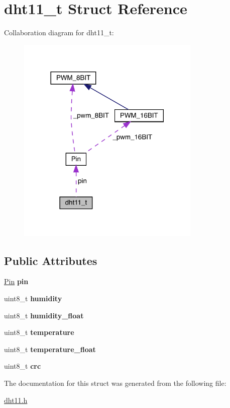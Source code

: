 \hypertarget{structdht11__t}{}\section{dht11\+\_\+t Struct Reference}
\label{structdht11__t}


Collaboration diagram for dht11\+\_\+t\+:\nopagebreak
\begin{figure}[H]
\begin{center}
\leavevmode
\includegraphics[width=248pt]{structdht11__t__coll__graph}
\end{center}
\end{figure}
\subsection*{Public Attributes}
\begin{DoxyCompactItemize}
\item 
\mbox{\label{structdht11__t_af7ba765d61375a8088a63e33b4e91a35}} 
\hyperlink{classPin}{Pin} {\bfseries pin}
\item 
\mbox{\label{structdht11__t_a981a3577bb83ac4f3f8f566e4eb9976c}} 
uint8\+\_\+t {\bfseries humidity}
\item 
\mbox{\label{structdht11__t_a3426ca69a0d25e6ff59cf1bb814194d5}} 
uint8\+\_\+t {\bfseries humidity\+\_\+float}
\item 
\mbox{\label{structdht11__t_acb375c16a957e10e3c316496492263da}} 
uint8\+\_\+t {\bfseries temperature}
\item 
\mbox{\label{structdht11__t_aebb3d3b42b5c014880980fc77af3f7b6}} 
uint8\+\_\+t {\bfseries temperature\+\_\+float}
\item 
\mbox{\label{structdht11__t_a51b07566b9cee55f9c9f473d4bda96d1}} 
uint8\+\_\+t {\bfseries crc}
\end{DoxyCompactItemize}


The documentation for this struct was generated from the following file\+:\begin{DoxyCompactItemize}
\item 
\hyperlink{dht11_8h}{dht11.\+h}\end{DoxyCompactItemize}
